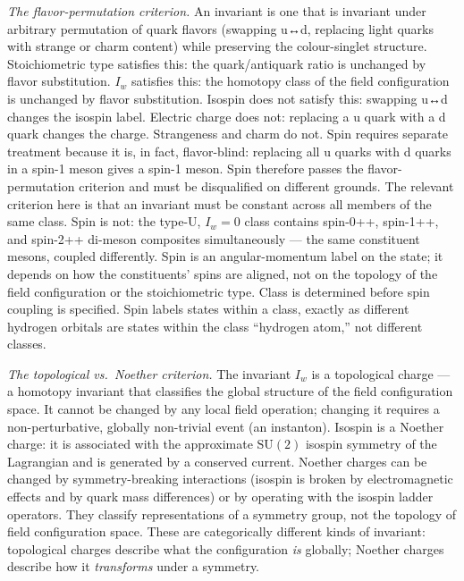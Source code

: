 \documentclass[12pt,a4paper]{article}
\begin{document}
\emph{The flavor-permutation criterion.} An invariant is one
that is invariant under arbitrary permutation of quark flavors (swapping
u↔d, replacing light quarks with strange or charm content) while
preserving the colour-singlet structure. Stoichiometric type satisfies
this: the quark/antiquark ratio is unchanged by flavor substitution.
\(I_w\) satisfies this: the homotopy class of the field configuration is
unchanged by flavor substitution. Isospin does not satisfy this:
swapping u↔d changes the isospin label. Electric charge does not:
replacing a u quark with a d quark changes the charge. Strangeness and
charm do not. Spin requires separate treatment because it is, in fact,
flavor-blind: replacing all u quarks with d quarks in a spin-1 meson
gives a spin-1 meson. Spin therefore passes the flavor-permutation
criterion and must be disqualified on different grounds. The relevant
criterion here is that an invariant must be constant across
all members of the same class. Spin is not: the type-U,
\(I_w = 0\) class contains spin-0++, spin-1++, and spin-2++
di-meson composites simultaneously --- the same constituent mesons,
coupled differently. Spin is an angular-momentum label on the state; it
depends on how the constituents' spins are aligned, not on the topology
of the field configuration or the stoichiometric type. Class
is determined before spin coupling is specified. Spin labels states
within a class, exactly as different hydrogen orbitals are states within
the class ``hydrogen atom,'' not different classes.

\emph{The topological vs.~Noether criterion.} The invariant \(I_w\) is a
topological charge --- a homotopy invariant that classifies the global
structure of the field configuration space. It cannot be changed by any
local field operation; changing it requires a non-perturbative, globally
non-trivial event (an instanton). Isospin is a Noether charge: it is
associated with the approximate \(\mathrm{SU}(2)\) isospin symmetry of
the Lagrangian and is generated by a conserved current. Noether charges
can be changed by symmetry-breaking interactions (isospin is broken by
electromagnetic effects and by quark mass differences) or by operating
with the isospin ladder operators. They classify representations of a
symmetry group, not the topology of field configuration space. These are
categorically different kinds of invariant: topological charges describe
what the configuration \emph{is} globally; Noether charges describe how
it \emph{transforms} under a symmetry.
\end{document}
